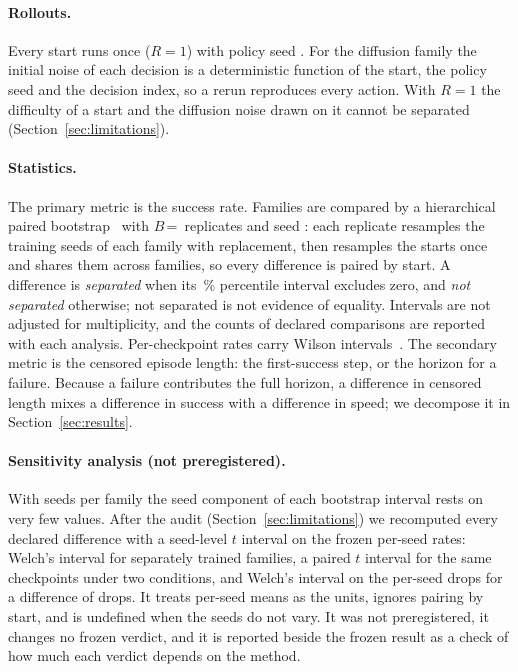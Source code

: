 \paragraph{Rollouts.} Every start runs once ($R = 1$) with policy seed .
For the diffusion family the initial noise of each decision is a deterministic function of
the start, the policy seed and the decision index, so a rerun reproduces every action. With
$R = 1$ the difficulty of a start and the diffusion noise drawn on it cannot be separated
(Section~\ref{sec:limitations}).

\paragraph{Statistics.} The primary metric is the success rate. Families are compared by a
hierarchical paired bootstrap~\citep{efron1979bootstrap,field2007clustered} with
$B$\,=\, replicates and seed : each replicate resamples the
 training seeds of each family with replacement, then resamples the
 starts once and shares them across families, so every difference is
paired by start. A difference is \emph{separated} when its \,\% percentile
interval excludes zero, and \emph{not separated} otherwise; not separated is not evidence of
equality. Intervals are not adjusted for multiplicity, and the counts of declared comparisons
are reported with each analysis. Per-checkpoint rates carry Wilson
intervals~\citep{wilson1927}. The secondary metric is the censored episode length: the
first-success step, or the horizon  for a failure. Because a failure
contributes the full horizon, a difference in censored length mixes a difference in success
with a difference in speed; we decompose it in Section~\ref{sec:results}.

\paragraph{Sensitivity analysis (not preregistered).} With  seeds per family
the seed component of each bootstrap interval rests on very few values. After the audit
(Section~\ref{sec:limitations}) we recomputed every declared difference with a seed-level
$t$ interval on the frozen per-seed rates: Welch's interval for separately trained families,
a paired $t$ interval for the same checkpoints under two conditions, and Welch's interval on
the per-seed drops for a difference of drops. It treats per-seed means as the units, ignores
pairing by start, and is undefined when the seeds do not vary. It was not preregistered, it
changes no frozen verdict, and it is reported beside the frozen result as a check of how much
each verdict depends on the method.

